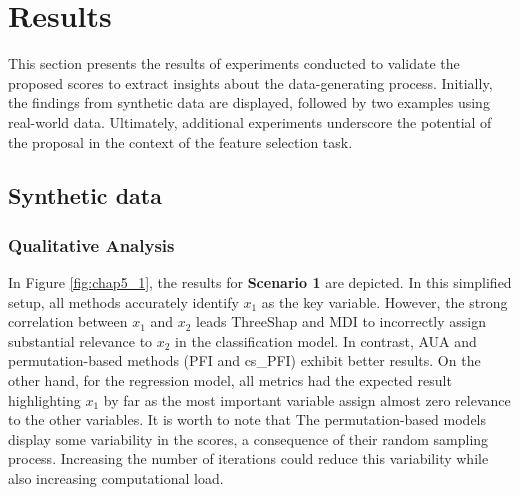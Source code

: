 \section{Results}

This section presents the results of experiments conducted to validate the proposed scores to extract insights about the data-generating process. Initially, the findings from synthetic data are displayed, followed by two examples using real-world data. Ultimately, additional experiments underscore the potential of the proposal in the context of the feature selection task.

\subsection{Synthetic data}

\subsubsection{Qualitative Analysis}

In Figure \ref{fig:chap5_1}, the results for \textbf{Scenario 1} are depicted. In this simplified setup, all methods accurately identify \(x_1\) as the key variable. However, the strong correlation between \(x_1\) and \(x_2\) leads ThreeShap and MDI to incorrectly assign substantial relevance to \(x_2\) in the classification model. In contrast, AUA and permutation-based methods (PFI and cs\_PFI) exhibit better results. On the other hand, for the regression model, all metrics had the expected result highlighting \(x_1\) by far as the most important variable assign almost zero relevance to the other variables. It is worth to note that The permutation-based models display some variability in the scores, a consequence of their random sampling process. Increasing the number of iterations could reduce this variability while also increasing computational load. 


